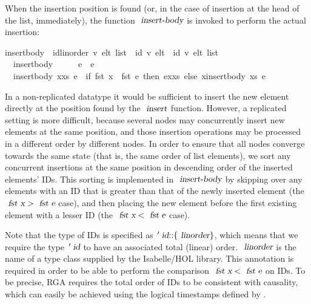 When the insertion position is found (or, in the case of insertion at the head of the list, immediately), the function $\isa{insert-body}$ is invoked to perform the actual insertion:
\begin{isabelle}
 insert{\isacharunderscore}body\ {\isacharcolon}{\isacharcolon}\ {\isachardoublequoteopen}{\isacharparenleft}{\isacharprime}id{\isacharcolon}{\isacharcolon}{\isacharbraceleft}linorder{\isacharbraceright}{\isacharcomma}\ {\isacharprime}v{\isacharparenright}\ elt\ list\ {\isasymRightarrow}\ {\isacharparenleft}{\isacharprime}id{\isacharcomma}\ {\isacharprime}v{\isacharparenright}\ elt\ {\isasymRightarrow}\ {\isacharparenleft}{\isacharprime}id{\isacharcomma}\ {\isacharprime}v{\isacharparenright}\ elt\ list{\isachardoublequoteclose}\ \isanewline
\ \ {\isachardoublequoteopen}insert{\isacharunderscore}body\ {\isacharbrackleft}{\isacharbrackright}\ \ \ \ \ e\ {\isacharequal}\ {\isacharbrackleft}e{\isacharbrackright}{\isachardoublequoteclose}\ {\isacharbar}\isanewline
\ \ {\isachardoublequoteopen}insert{\isacharunderscore}body\ {\isacharparenleft}x{\isacharhash}xs{\isacharparenright}\ e\ {\isacharequal}\ {\isacharparenleft}if\ fst\ x\ {\isacharless}\ fst\ e\ then\ e{\isacharhash}x{\isacharhash}xs\ else\ x{\isacharhash}insert{\isacharunderscore}body\ xs\ e{\isacharparenright}{\isachardoublequoteclose}
\end{isabelle}

In a non-replicated datatype it would be sufficient to insert the new element directly at the position found by the $\isa{insert}$ function.
However, a replicated setting is more difficult, because several nodes may concurrently insert new elements at the same position, and those insertion operations may be processed in a different order by different nodes.
In order to ensure that all nodes converge towards the same state (that is, the same order of list elements), we sort any concurrent insertions at the same position in descending order of the inserted elements' IDs.
This sorting is implemented in $\isa{insert-body}$ by skipping over any elements with an ID that is greater than that of the newly inserted element (the $\isa{fst x} > \isa{fst e}$ case), and then placing the new element before the first existing element with a lesser ID (the $\isa{fst x} < \isa{fst e}$ case).

Note that the type of IDs is specified as $\isacharprime\isa{id}\isacharcolon\isacharcolon\isacharbraceleft\isa{linorder}\isacharbraceright$, which means that we require the type $\isacharprime\isa{id}$ to have an associated total (linear) order.
$\isa{linorder}$ is the name of a type class supplied by the Isabelle/HOL library.
This annotation is required in order to be able to perform the comparison $\isa{fst x} < \isa{fst e}$ on IDs.
To be precise, RGA requires the total order of IDs to be consistent with causality, which can easily be achieved using the logical timestamps defined by \citet{Lamport:1978jq}.


